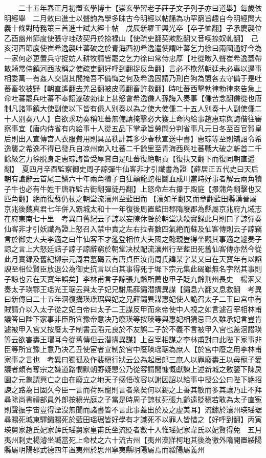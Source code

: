 　　二十五年春正月初置玄學博士【崇玄學習老子莊子文子列子亦曰道舉】每歲依明經舉　二月敕曰進士以聲韵為學多昧古今明經以帖誦為功罕窮旨趣自今明經問大義十條對時務策三首進士試大經十帖　戊辰新羅王興光卒【卒子恤翻】子承慶襲位　乙酉幽州節度使張守珪破契丹於捺禄山【使疏吏翻契欺訖翻又音喫捺奴軋翻】　己亥河西節度使崔希逸襲吐蕃破之於青海西初希逸遣使謂吐蕃乞力徐曰兩國通好今為一家何必更置兵守捉妨人耕牧請皆罷之乞力徐曰常侍忠厚【吐從暾入聲崔希逸蓋帶散騎常侍鎮河西故稱之使疏吏翻好呼到翻捉反角翻】言必不欺然朝廷未必專以邊事相委萬一有姦人交闘其間掩吾不備悔之何及希逸固請乃刑白狗為盟各去守備于是吐蕃畜牧被野【朝直遙翻去羌呂翻被皮義翻畜許救翻】時吐蕃西擊勃律勃律來告急上命吐蕃罷兵吐蕃不奉詔遂破勃律上甚怒會希逸傔人孫誨入奏事【傔苦念翻傔從也唐制凡諸軍鎮大使副使以下皆有傔人别奏以為之使大使傔二十五人别奏十人副使傔二十人别奏八人】自欲求功奏稱吐蕃無備請掩擊必大獲上命内給事趙惠琮與誨偕往審察事宜【唐内侍省有内給事十人從五品下掌承旨勞問分判省事凡元日冬至百官賀皇后則出入宣傳宫人衣服費用則具品秩計其多少春秋宣送中書】惠琮等至則矯詔令希逸襲之希逸不得已發兵自凉州南入吐蕃二千餘里至青海西與吐蕃戰大破之斬首二千餘級乞力徐脱身走惠琮誨皆受厚賞自是吐蕃復絶朝貢【復扶又翻下而復同朝直遥翻】　夏四月辛酉監察御史周子諒彈牛仙客非才引䜟書為證【薛居正五代史曰天后朝有䜟辭云首尾三鱗六十年兩角犢子自狂顛龍蛇相鬬血成川當時好事者解云兩角犢子牛也必有牛姓干唐祚監古衘翻彈徒丹翻】上怒命左右㩧于殿庭【㩧蒲角翻擊也又匹角翻】絶而復蘇仍杖之朝堂流瀼州至藍田而【瀼如羊翻又而章翻藍田縣漢晉屬京兆後魏真君七年併入霸城太和十一年復後周置藍田郡隋廢郡為縣屬京兆府九域志在府東南七十里　考異曰舊紀云子諒以妄陳休咎於朝堂决殺實録此月則曰子諒彈奏仙客非才引妖䜟為證上怒召入禁中責之左右拉者數四氣絶而蘇及仙客傳則云子諒竊言於御史大夫李適之曰牛仙客不才濫登相位大夫國之懿親豈得坐觀其事適之遽奏子諒之言上大怒廷詰子諒子諒辭窮於朝堂决杖配流瀼州行至藍田死舊仙客傳亦然今從此月實録及舊紀柳宗元周君墓碣云有唐貞臣汝南周氏諱某字某又曰在天寶年有以諂諛至相位賢臣放退公為御史抗言以白其事得死于墀下宗元集此碣雖無名字然其事則子諒也云在天寶年誤矣】李林甫言子諒張九齡所薦也甲子貶九齡荆州長史　楊洄又奏太子瑛鄂王瑶光王琚云與太子妃兄駙馬薛鏽潜搆異謀【鏽息六翻又息救翻　考異曰新傳曰二十五年洄復搆瑛瑶琚與妃之兄薛鏽異謀惠妃使人詭召太子二王曰宫中有賊請介以入太子從之妃白帝曰太子二王謀反甲而來帝使中人視之如言遽召宰相林甫議答曰陛下家事非臣所宜豫帝意决乃廢瑛等按瑛等與惠妃相猜忌已久雖承妃言豈肯遽被甲入宫又按廢太子制書云䧟元良於不友誤二子於不義不言被甲入宫也盖洄譛瑛等云欲害夀王瑁耳今從舊傳但云潜搆異謀】上召宰相謀之李林甫對曰此陛下家事非臣等所宜豫上意乃决乙丑使宦者宣制於宫中廢瑛瑶琚為庶人【於宫中廢之用李林甫家事之言也　考異曰獨孤及作裴稹行狀云公為起居郎三庶人以罪廢夀王以母寵子愛議者頗有奪宗之嫌道路憫默朝野疑愳公乃從容請間慷慨獻諫上述新城之敫鑒下陳戾園之元龜謂興亡之由在廢立之地天子感悟改容以謝因詔以給事中授公公曰陛下絶招諫之路為日固久今臣一言而荷殊寵則言者衆矣何以錫之上善其敏而多其讓乃止不拜尋除尚書禮部員外郎按稹光庭之子當是時周子諒杖死張九齡遠貶稹若敢為太子直寃則聲振宇宙豈得湮沒無聞而諸書皆不言此事蓋出於及之虚美耳】流鏽於瀼州瑛瑶琚尋賜死城東驛鏽賜死於藍田瑶琚皆好學有才識死不以罪人皆惜之【好呼到翻】丙寅瑛舅家趙氏妃家薛氏瑶舅家皇甫氏坐流貶者數十人惟瑶妃家韋氏以妃賢得免　五月夷州刺史楊濬坐贓當死上命杖之六十流古州【夷州漢牂柯地其後為徼外隋開置綏陽縣屬明陽郡武德四年置夷州於思州寧夷縣明陽屬焉而綏陽屬義州